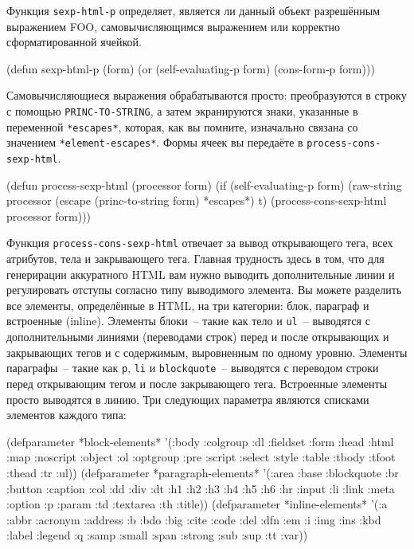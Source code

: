 Функция \lstinline{sexp-html-p} определяет, является ли данный объект разрешённым выражением
FOO, самовычисляющимся выражением или корректно сформатированной ячейкой.

\begin{myverb}
(defun sexp-html-p (form)
  (or (self-evaluating-p form) (cons-form-p form)))
\end{myverb}

Самовычисляющиеся выражения обрабатываются просто: преобразуются в строку с помощью
\lstinline{PRINC-TO-STRING}, а затем экранируются знаки, указанные в переменной
\lstinline{*escapes*}, которая, как вы помните, изначально связана со значением
\lstinline{*element-escapes*}. Формы ячеек вы передаёте в \lstinline{process-cons-sexp-html}.

\begin{myverb}
(defun process-sexp-html (processor form)
  (if (self-evaluating-p form)
    (raw-string processor (escape (princ-to-string form) *escapes*) t)
    (process-cons-sexp-html processor form)))
\end{myverb}

Функция \lstinline{process-cons-sexp-html} отвечает за вывод открывающего тега, всех атрибутов,
тела и закрывающего тега. Главная трудность здесь в том, что для генерирации аккуратного
HTML вам нужно выводить дополнительные линии и регулировать отступы согласно типу
выводимого элемента. Вы можете разделить все элементы, определённые в HTML, на три
категории: блок, параграф и встроенные (inline). Элементы блоки~-- такие как тело и \lstinline{ul}~--
выводятся с дополнительными линиями (переводами строк) перед и после открывающих и
закрывающих тегов и с содержимым, выровненным по одному уровню. Элементы параграфы~--
такие как \lstinline{p}, \lstinline{li} и \lstinline{blockquote}~-- выводятся с переводом строки перед
открывающим тегом и после закрывающего тега. Встроенные элементы просто выводятся в
линию. Три следующих параметра являются списками элементов каждого типа:

\begin{myverb}
(defparameter *block-elements*
  '(:body :colgroup :dl :fieldset :form :head :html :map :noscript :object
    :ol :optgroup :pre :script :select :style :table :tbody :tfoot :thead
    :tr :ul))
(defparameter *paragraph-elements*
  '(:area :base :blockquote :br :button :caption :col :dd :div :dt :h1
    :h2 :h3 :h4 :h5 :h6 :hr :input :li :link :meta :option :p :param
    :td :textarea :th :title))
(defparameter *inline-elements*
  '(:a :abbr :acronym :address :b :bdo :big :cite :code :del :dfn :em
    :i :img :ins :kbd :label :legend :q :samp :small :span :strong :sub
    :sup :tt :var))
\end{myverb}

